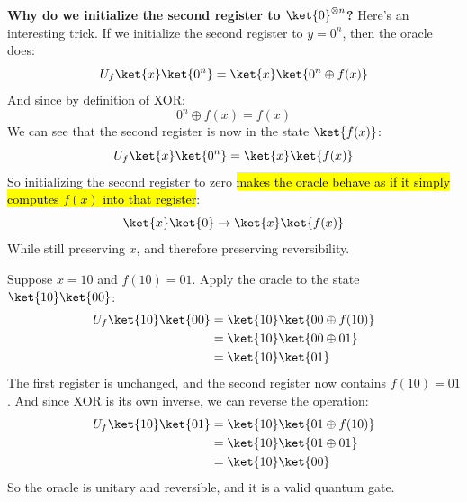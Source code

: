 \highspace
\textcolor{Green3}{ \textbf{Why do we initialize the second register to $\ket{0}^{\otimes n}$?}} Here's an interesting trick. If we initialize the second register to $y = 0^n$, then the oracle does:
\begin{equation*}
    U_f \ket{x} \ket{0^{n}} = \ket{x} \ket{0^{n} \oplus f(x)}
\end{equation*}
And since by definition of XOR:
\begin{equation*}
    0^{n} \oplus f(x) = f(x)
\end{equation*}
We can see that the second register is now in the state $\ket{f(x)}$:
\begin{equation*}
    U_f \ket{x} \ket{0^{n}} = \ket{x} \ket{f(x)}
\end{equation*}
So initializing the second register to zero \hl{makes the oracle behave as if it simply computes $f(x)$ into that register}:
\begin{equation*}
    \ket{x} \ket{0} \to \ket{x} \ket{f(x)}
\end{equation*}
While still preserving $x$, and therefore preserving reversibility.

\highspace
\begin{examplebox}
    Suppose $x=10$ and $f(10) = 01$. Apply the oracle to the state $\ket{10}\ket{00}$:
    \begin{align*}
        U_f \ket{10}\ket{00} &= \ket{10}\ket{00 \oplus f(10)} \\
        &= \ket{10}\ket{00 \oplus 01} \\
        &= \ket{10}\ket{01}
    \end{align*}
    The first register is unchanged, and the second register now contains $f(10) = 01$. And since XOR is its own inverse, we can reverse the operation:
    \begin{align*}
        U_f \ket{10}\ket{01} &= \ket{10}\ket{01 \oplus f(10)} \\
        &= \ket{10}\ket{01 \oplus 01} \\
        &= \ket{10}\ket{00}
    \end{align*}
    So the oracle is unitary and reversible, and it is a valid quantum gate.
\end{examplebox}

